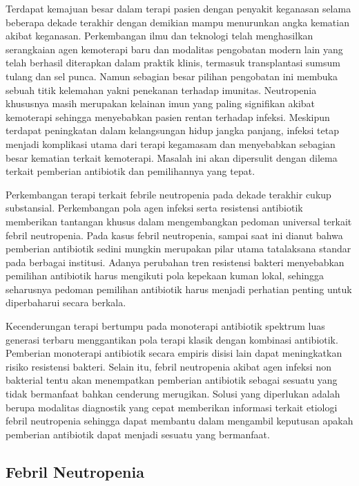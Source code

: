 \documentclass[
  10pt,
  letterpaper,
]{article}
\begin{document}
Terdapat kemajuan besar dalam terapi pasien dengan penyakit keganasan
selama beberapa dekade terakhir dengan demikian mampu menurunkan angka
kematian akibat keganasan. Perkembangan ilmu dan teknologi telah
menghasilkan serangkaian agen kemoterapi baru dan modalitas pengobatan
modern lain yang telah berhasil diterapkan dalam praktik klinis,
termasuk transplantasi sumsum tulang dan sel punca. Namun sebagian besar
pilihan pengobatan ini membuka sebuah titik kelemahan yakni penekanan
terhadap imunitas. Neutropenia khususnya masih merupakan kelainan imun
yang paling signifikan akibat kemoterapi sehingga menyebabkan pasien
rentan terhadap infeksi. Meskipun terdapat peningkatan dalam
kelangsungan hidup jangka panjang, infeksi tetap menjadi komplikasi
utama dari terapi kegamasam dan menyebabkan sebagian besar kematian
terkait kemoterapi. Masalah ini akan dipersulit dengan dilema terkait
pemberian antibiotik dan pemilihannya yang tepat.\citep{sipsas}

Perkembangan terapi terkait febrile neutropenia pada dekade terakhir
cukup substansial.\citep{sipsas} Perkembangan pola agen infeksi serta
resistensi antibiotik memberikan tantangan khusus dalam mengembangkan
pedoman universal terkait febril neutropenia. Pada kasus febril
neutropenia, sampai saat ini dianut bahwa pemberian antibiotik sedini
mungkin merupakan pilar utama tatalaksana standar pada berbagai
institusi. Adanya perubahan tren resistensi bakteri menyebabkan
pemilihan antibiotik harus mengikuti pola kepekaan kuman lokal, sehingga
seharusnya pedoman pemilihan antibiotik harus menjadi perhatian penting
untuk diperbaharui secara berkala.\citep{sipsas}

Kecenderungan terapi bertumpu pada monoterapi antibiotik spektrum luas
generasi terbaru menggantikan pola terapi klasik dengan kombinasi
antibiotik. Pemberian monoterapi antibiotik secara empiris disisi lain
dapat meningkatkan risiko resistensi bakteri.\citep{sipsas} Selain itu,
febril neutropenia akibat agen infeksi non bakterial tentu akan
menempatkan pemberian antibiotik sebagai sesuatu yang tidak bermanfaat
bahkan cenderung merugikan. Solusi yang diperlukan adalah berupa
modalitas diagnostik yang cepat memberikan informasi terkait etiologi
febril neutropenia sehingga dapat membantu dalam mengambil keputusan
apakah pemberian antibiotik dapat menjadi sesuatu yang bermanfaat.

\subsection{Febril Neutropenia}\label{febril-neutropenia}
\end{document}
